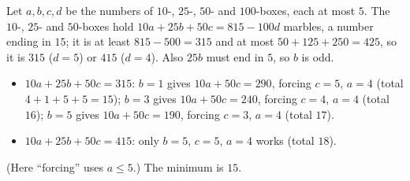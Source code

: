 Let $a,b,c,d$ be the numbers of $10$-, $25$-, $50$- and $100$-boxes, each at most $5$. The $10$-, $25$- and $50$-boxes hold $10a+25b+50c=815-100d$ marbles, a number ending in $15$; it is at least $815-500=315$ and at most $50+125+250=425$, so it is $315$ ($d=5$) or $415$ ($d=4$). Also $25b$ must end in $5$, so $b$ is odd.
\begin{itemize}
\item $10a+25b+50c=315$: $b=1$ gives $10a+50c=290$, forcing $c=5$, $a=4$ (total $4+1+5+5=15$); $b=3$ gives $10a+50c=240$, forcing $c=4$, $a=4$ (total $16$); $b=5$ gives $10a+50c=190$, forcing $c=3$, $a=4$ (total $17$).
\item $10a+25b+50c=415$: only $b=5$, $c=5$, $a=4$ works (total $18$).
\end{itemize}
(Here ``forcing'' uses $a\le5$.) The minimum is $\boxed{15}$.
